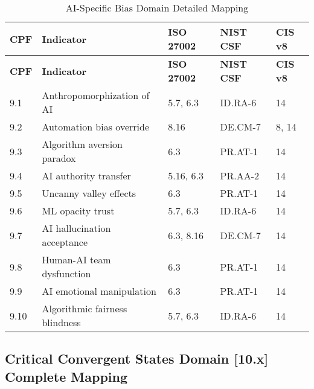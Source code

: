 \documentclass[11pt,a4paper]{article}
\begin{document}
\begin{longtable}{p{1cm}p{4cm}p{2.5cm}p{2.5cm}p{2cm}}
\caption{AI-Specific Bias Domain Detailed Mapping} \\
\toprule
\textbf{CPF} & \textbf{Indicator} & \textbf{ISO 27002} & \textbf{NIST CSF} & \textbf{CIS v8} \\
\midrule
\endfirsthead
\toprule
\textbf{CPF} & \textbf{Indicator} & \textbf{ISO 27002} & \textbf{NIST CSF} & \textbf{CIS v8} \\
\midrule
\endhead
\bottomrule
\endlastfoot

9.1 & Anthropomorphization of AI & 5.7, 6.3 & ID.RA-6 & 14 \\
9.2 & Automation bias override & 8.16 & DE.CM-7 & 8, 14 \\
9.3 & Algorithm aversion paradox & 6.3 & PR.AT-1 & 14 \\
9.4 & AI authority transfer & 5.16, 6.3 & PR.AA-2 & 14 \\
9.5 & Uncanny valley effects & 6.3 & PR.AT-1 & 14 \\
9.6 & ML opacity trust & 5.7, 6.3 & ID.RA-6 & 14 \\
9.7 & AI hallucination acceptance & 6.3, 8.16 & DE.CM-7 & 14 \\
9.8 & Human-AI team dysfunction & 6.3 & PR.AT-1 & 14 \\
9.9 & AI emotional manipulation & 6.3 & PR.AT-1 & 14 \\
9.10 & Algorithmic fairness blindness & 5.7, 6.3 & ID.RA-6 & 14 \\

\end{longtable}

\subsection{Critical Convergent States Domain [10.x] Complete Mapping}
\end{document}
